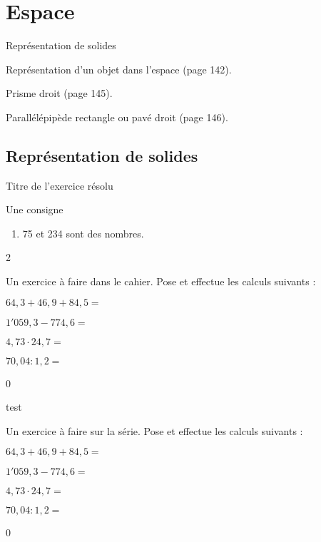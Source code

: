 \documentclass[a4paper,11pt]{report}
\begin{document}
\newcommand{\chapterName}{Espace}
\newcommand{\serieName}{Représentation de solides}


\chapter*{\chapterName}
\thispagestyle{empty}

\begin{amL}{\serieName}{
\item Représentation d’un objet dans l’espace (page 142).
\item Prisme droit (page 145).
\item Parallélépipède rectangle ou pavé droit (page 146).
}
\end{amL}
\section*{\serieName}
\setcounter{page}{1}

\begin{resolu}{Titre de l'exercice résolu}
{Une consigne 
\begin{enumerate}
\item 75 et 234 sont des {\color{blue}nombres}.
\end{enumerate}}{2}
\end{resolu}

\begin{exo}{
Un exercice à faire dans le cahier.
Pose et effectue les calculs suivants :
\begin{enumerate}
\begin{multicols}{2}
\item $64,3+46,9+84,5 =$
\item $1'059,3-774,6=$
\item $4,73\cdot 24,7 =$
\item $70,04 : 1,2 =$
\end{multicols}
\end{enumerate}
\smallskip}{0}
\end{exo}

\begin{exoc}{
	test
}
\end{exoc}

\begin{exop}{
Un exercice à faire sur la série.
Pose et effectue les calculs suivants :
\begin{enumerate}
\begin{multicols}{2}
\item $64,3+46,9+84,5 =$
\item $1'059,3-774,6=$
\item $4,73\cdot 24,7 =$
\item $70,04 : 1,2 =$
\end{multicols}
\end{enumerate}
\smallskip}{0}
\end{exop}
\end{document}
